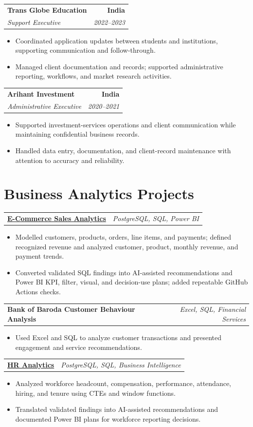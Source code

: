 \documentclass[letterpaper,10pt]{article}
\makeatletter
\newcommand{\role}[4]{%
  \begin{tabularx}{\textwidth}{@{}Xr@{}}
    \textbf{#1} & \textbf{#2} \\
    \textit{#3} & \textit{#4}
  \end{tabularx}\vspace{-1pt}
}
\newcommand{\project}[2]{%
  \begin{tabularx}{\textwidth}{@{}Xr@{}}
    \textbf{#1} & \textit{#2}
  \end{tabularx}\vspace{-1pt}
}
\makeatother
\begin{document}
\role{Trans Globe Education}{India}{Support Executive}{2022--2023}
\begin{itemize}
  \item Coordinated application updates between students and institutions, supporting communication and follow-through.
  \item Managed client documentation and records; supported administrative reporting, workflows, and market research activities.
\end{itemize}
\vspace{1pt}

\role{Arihant Investment}{India}{Administrative Executive}{2020--2021}
\begin{itemize}
  \item Supported investment-services operations and client communication while maintaining confidential business records.
  \item Handled data entry, documentation, and client-record maintenance with attention to accuracy and reliability.
\end{itemize}

\section{Business Analytics Projects}
\project{\href{https://github.com/jainalimehta/Ecommerce-Sales-Analytics}{E-Commerce Sales Analytics}}{PostgreSQL, SQL, Power BI}
\begin{itemize}
  \item Modelled customers, products, orders, line items, and payments; defined recognized revenue and analyzed customer, product, monthly revenue, and payment trends.
  \item Converted validated SQL findings into AI-assisted recommendations and Power BI KPI, filter, visual, and decision-use plans; added repeatable GitHub Actions checks.
\end{itemize}
\vspace{1pt}

\project{Bank of Baroda Customer Behaviour Analysis}{Excel, SQL, Financial Services}
\begin{itemize}
  \item Used Excel and SQL to analyze customer transactions and presented engagement and service recommendations.
\end{itemize}
\vspace{1pt}

\project{\href{https://github.com/jainalimehta/HR-Analytics}{HR Analytics}}{PostgreSQL, SQL, Business Intelligence}
\begin{itemize}
  \item Analyzed workforce headcount, compensation, performance, attendance, hiring, and tenure using CTEs and window functions.
  \item Translated validated findings into AI-assisted recommendations and documented Power BI plans for workforce reporting decisions.
\end{itemize}
\end{document}
